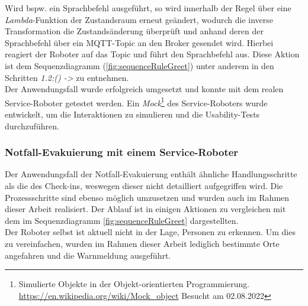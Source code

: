         Wird bspw. ein Sprachbefehl ausgeführt, so wird innerhalb der Regel über eine \textit{Lambda}-Funktion der Zustandsraum erneut geändert, wodurch die inverse Transformation 
        die Zustandsänderung überprüft und anhand deren der Sprachbefehl über ein \acs{MQTT}-Topic an den Broker gesendet wird. Hierbei reagiert der Roboter auf das Topic und führt 
        den Sprachbefehl aus. Diese Aktion ist dem Sequenzdiagramm (\ref{fig:sequenceRuleGreet}) unter anderem in den Schritten \textit{1.2:() ->} zu entnehmen. 
        \\
        Der Anwendungsfall wurde erfolgreich umgesetzt und konnte mit dem realen Service-Roboter getestet werden. 
        Ein \textit{Mock}\footnote{Simulierte Objekte in der Objekt-orientierten Programmierung. \url{https://en.wikipedia.org/wiki/Mock_object} Besucht am 02.08.2022} 
        des Service-Roboters wurde entwickelt, um die Interaktionen zu simulieren und die Usability-Tests durchzuführen. 
    
    \subsubsection*{Notfall-Evakuierung mit einem Service-Roboter}
        Der Anwendungsfall der Notfall-Evakuierung enthält ähnliche Handlungsschritte als die des Check-ins, weswegen dieser nicht detailliert 
        aufgegriffen wird. Die Prozessschritte sind ebenso möglich umzusetzen und wurden auch im Rahmen dieser 
        Arbeit realisiert. Der Ablauf ist in einigen Aktionen zu vergleichen mit dem im Sequenzdiagramm \ref{fig:sequenceRuleGreet} dargestellten. 
        \\
        Der Roboter selbst ist aktuell nicht in der Lage, Personen zu erkennen. Um dies zu vereinfachen, wurden im Rahmen dieser Arbeit 
        lediglich bestimmte Orte angefahren und die Warnmeldung ausgeführt. 
        
